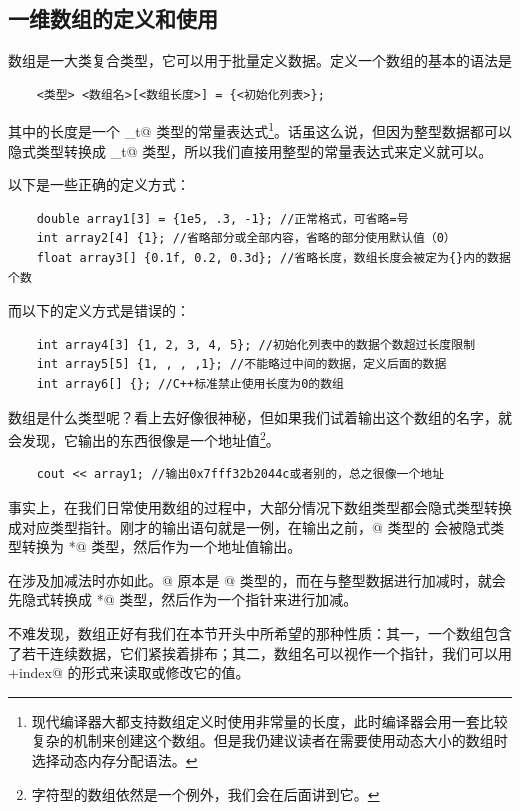 \subsection*{一维数组的定义和使用}
数组是一大类复合类型，它可以用于批量定义数据。定义一个数组的基本的语法是
\begin{lstlisting}
    <类型> <数组名>[<数组长度>] = {<初始化列表>};
\end{lstlisting}
其中的长度是一个 \lstinline@size_t@ 类型的常量表达式\footnote{现代编译器大都支持数组定义时使用非常量的长度，此时编译器会用一套比较复杂的机制来创建这个数组。但是我仍建议读者在需要使用动态大小的数组时选择动态内存分配语法。}。话虽这么说，但因为整型数据都可以隐式类型转换成 \lstinline@size_t@ 类型，所以我们直接用整型的常量表达式来定义就可以。\par
以下是一些正确的定义方式：
\begin{lstlisting}
    double array1[3] = {1e5, .3, -1}; //正常格式，可省略=号
    int array2[4] {1}; //省略部分或全部内容，省略的部分使用默认值（0）
    float array3[] {0.1f, 0.2, 0.3d}; //省略长度，数组长度会被定为{}内的数据个数
\end{lstlisting}
而以下的定义方式是错误的：
\begin{lstlisting}
    int array4[3] {1, 2, 3, 4, 5}; //初始化列表中的数据个数超过长度限制
    int array5[5] {1, , , ,1}; //不能略过中间的数据，定义后面的数据
    int array6[] {}; //C++标准禁止使用长度为0的数组
\end{lstlisting}
数组是什么类型呢？看上去好像很神秘，但如果我们试着输出这个数组的名字，就会发现，它输出的东西很像是一个地址值\footnote{字符型的数组依然是一个例外，我们会在后面讲到它。}。
\begin{lstlisting}
    cout << array1; //输出0x7fff32b2044c或者别的，总之很像一个地址
\end{lstlisting}\par
事实上，在我们日常使用数组的过程中，大部分情况下数组类型都会隐式类型转换成对应类型指针。刚才的输出语句就是一例，在输出之前，\lstinline@double[3]@ 类型的 \lstinline@array@ 会被隐式类型转换为 \lstinline@double*@ 类型，然后作为一个地址值输出。\par
在涉及加减法时亦如此。@ 原本是 \lstinline@int[4]@ 类型的，而在与整型数据进行加减时，就会先隐式转换成 \lstinline@int*@ 类型，然后作为一个指针来进行加减。\par
不难发现，数组正好有我们在本节开头中所希望的那种性质：其一，一个数组包含了若干连续数据，它们紧挨着排布；其二，数组名可以视作一个指针，我们可以用 \lstinline@p+index@ 的形式来读取或修改它的值。\par
